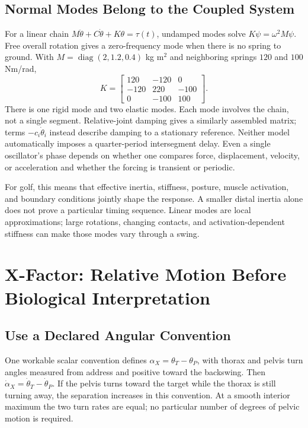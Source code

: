 \subsection{Normal Modes Belong to the Coupled System}
For a linear chain $M\ddot\theta+C\dot\theta+K\theta=\tau(t)$, undamped modes solve $K\psi=\omega^2M\psi$. Free overall rotation gives a zero-frequency mode when there is no spring to ground. With $M=\operatorname{diag}(2,1.2,0.4)$ kg m$^2$ and neighboring springs $120$ and $100$ Nm/rad,
\begin{equation}
K=\begin{bmatrix}120&-120&0\\-120&220&-100\\0&-100&100\end{bmatrix}.
\end{equation}
There is one rigid mode and two elastic modes. Each mode involves the chain, not a single segment. Relative-joint damping gives a similarly assembled matrix; terms $-c_i\dot\theta_i$ instead describe damping to a stationary reference. Neither model automatically imposes a quarter-period intersegment delay. Even a single oscillator's phase depends on whether one compares force, displacement, velocity, or acceleration and whether the forcing is transient or periodic.

For golf, this means that effective inertia, stiffness, posture, muscle activation, and boundary conditions jointly shape the response. A smaller distal inertia alone does not prove a particular timing sequence. Linear modes are local approximations; large rotations, changing contacts, and activation-dependent stiffness can make those modes vary through a swing.

\section{X-Factor: Relative Motion Before Biological Interpretation}
\subsection{Use a Declared Angular Convention}
One workable scalar convention defines $\alpha_X=\theta_T-\theta_P$, with thorax and pelvis turn angles measured from address and positive toward the backswing. Then $\dot\alpha_X=\dot\theta_T-\dot\theta_P$. If the pelvis turns toward the target while the thorax is still turning away, the separation increases in this convention. At a smooth interior maximum the two turn rates are equal; no particular number of degrees of pelvic motion is required.

